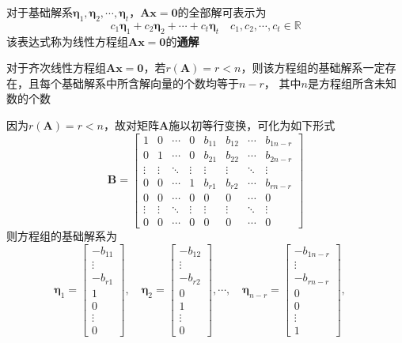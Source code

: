 \documentclass[UTF8]{ctexart}
\newcommand{\ve}[1]{{\bm{#1}}}
\newcommand{\mat}[1]{\ve{#1}}
\newcommand{\set}[1]{{\mathbb{#1}}}
\newcommand{\emplin}{\vspace{1em}}
\begin{document}
\emplin
\emplin

对于基础解系$\mat{\eta}_1,\mat{\eta}_2,\cdots,\mat{\eta}_t$，$\mat{A}\mat{x}=\mat{0}$的全部解可表示为
\[c_1\mat{\eta}_1+c_2\mat{\eta}_2+\cdots+c_t\mat{\eta}_t\quad c_1,c_2,\cdots,c_t\in\set{R}\]
该表达式称为线性方程组$\mat{A}\mat{x}=\mat{0}$的\textbf{通解}

\emplin
\emplin
\emplin

对于齐次线性方程组$\mat{A}\mat{x}=\mat{0}$，若$r(\mat{A})=r<n$，则该方程组的基础解系一定存在，且每个基础解系中所含解向量的个数均等于$n-r$，
其中$n$是方程组所含未知数的个数

因为$r(\mat{A})=r<n$，故对矩阵$\mat{A}$施以初等行变换，可化为如下形式
\[\mat{B}=\begin{bmatrix}
1&0&\cdots&0&b_{11}&b_{12}&\cdots&b_{1{n-r}}\\
0&1&\cdots&0&b_{21}&b_{22}&\cdots&b_{2{n-r}}\\
\vdots&\vdots&\ddots&\vdots&\vdots&\vdots&\ddots&\vdots\\
0&0&\cdots&1&b_{r1}&b_{r2}&\cdots&b_{r{n-r}}\\
0&0&\cdots&0&0&0&\cdots&0\\
\vdots&\vdots&\ddots&\vdots&\vdots&\vdots&\ddots&\vdots\\
0&0&\cdots&0&0&0&\cdots&0
\end{bmatrix}\]
则方程组的基础解系为
\[\mat{\eta}_1=\begin{bmatrix}
-b_{11}\\
\vdots\\
-b_{r1}\\
1\\
0\\
\vdots\\
0
\end{bmatrix},\quad
\mat{\eta}_2=\begin{bmatrix}
-b_{12}\\
\vdots\\
-b_{r2}\\
0\\
1\\
\vdots\\
0
\end{bmatrix},
\cdots,\quad
\mat{\eta}_{n-r}=\begin{bmatrix}
-b_{1{n-r}}\\
\vdots\\
-b_{r{n-r}}\\
0\\
0\\
\vdots\\
1
\end{bmatrix},\quad
\]
\end{document}
